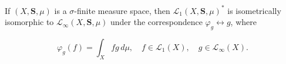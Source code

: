 If $(X, \mathbf{S}, \mu)$ is a $\sigma$-finite measure space, then $\mathcal{L}_1(X, \mathbf{S}, \mu)^*$ is isometrically isomorphic to $\mathcal{L}_\infty(X, \mathbf{S}, \mu)$ under the correspondence $\varphi_g \leftrightarrow g$, where

$$\varphi_g(f) = \int_X f g \, d\mu, \quad f \in \mathcal{L}_1(X), \quad g \in \mathcal{L}_\infty(X).$$
